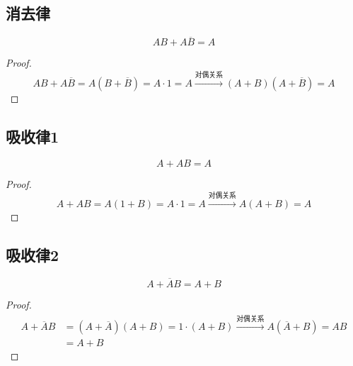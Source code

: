 \subsection{消去律}
\label{sec:消去律}

\begin{theorem}[消去律]
	\begin{equation}
		AB+A\overline{B}=A
		\label{eq:常用公式:消去律}
	\end{equation}
\end{theorem}

\begin{proof}
	\begin{equation}
		AB+A\overline{B}=A(B+\overline{B})=A\cdot1=A
		\xrightarrow{\text{对偶关系}}(A+B)(A+\overline{B})=A
	\end{equation}
\end{proof}

\subsection{吸收律1}
\label{sec:吸收律1}

\begin{theorem}[吸收律1]
	\begin{equation}
		A+AB=A
		\label{eq:常用公式:吸收律1}
	\end{equation}
\end{theorem}

\begin{proof}
	\begin{equation}
		A+AB=A(1+B)=A\cdot1=A
		\xrightarrow{\text{对偶关系}}A(A+B)=A
	\end{equation}
\end{proof}

\subsection{吸收律2}
\label{sec:吸收律2}

\begin{theorem}[吸收律2]
	\begin{equation}
		A+\overline{A}B=A+B
		\label{eq:常用公式:吸收律2}
	\end{equation}
\end{theorem}

\begin{proof}
	\begin{equation}
		\begin{aligned}
			A+\overline{A}B &= (A+\overline{A})(A+B)=1\cdot(A+B)
			\xrightarrow{\text{对偶关系}}A(\overline{A}+B)=AB \\
			&= A+B
		\end{aligned}
	\end{equation}
\end{proof}

